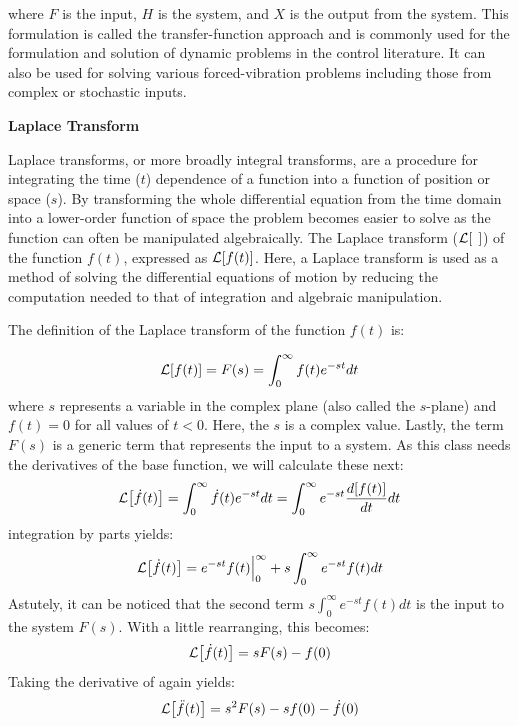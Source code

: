 \documentclass[12pt,letter]{article}
\begin{document}
			\noindent where $F$ is the input, $H$ is the system, and $X$ is the output from the system. This formulation is called the transfer-function approach and is commonly used for the formulation and solution of dynamic problems in the control literature. It can also be used for solving various forced-vibration problems including those from complex or stochastic inputs. 




\begin{review}
	\label{sec:Laplace_review}
	
	\textbf{Laplace Transform}
	
	\noindent Laplace transforms, or more broadly integral transforms, are a procedure for integrating the time ($t$) dependence of a function into a function of position or space ($s$). By transforming the whole differential equation from the time domain into a lower-order function of space the problem becomes easier to solve as the function can often be manipulated algebraically. The Laplace transform ($\mathcal{L}{\left[\hspace{1ex}\right]}$) of the function $f(t)$, expressed as $\mathcal{L}{\left[f(t)\right]}$. Here, a Laplace transform is used as a method of solving the differential equations of motion by reducing the computation needed to that of integration and algebraic manipulation. 
	
	The definition of the Laplace transform of the function $f(t)$ is:
	
	\begin{equation}
		\mathcal{L}{\left[f(t)\right]} = F(s) = \int_{0}^{\infty} f(t)e^{-st}dt
	\end{equation}
	where $s$ represents a variable in the complex plane (also called the $s$-plane) and $f(t)=0$ for all values of $t<0$. Here, the $s$ is a complex value. Lastly, the term $F(s)$ is a generic term that represents the input to a system. As this class needs the derivatives of the base function, we will calculate these next:
	\begin{equation}
		\mathcal{L}{\left[\dot{f}(t)\right]} = \int_{0}^{\infty} \dot{f}(t)e^{-st}dt = \int_{0}^{\infty} e^{-st}\frac{d[f(t)]}{dt}dt 
	\end{equation}		
	integration by parts yields:
	\begin{equation}
		\mathcal{L}{\left[\dot{f}(t)\right]} = e^{-st}f(t)\Big|_0^\infty+s\int_{0}^{\infty}e^{-st}f(t)dt
	\end{equation}
	Astutely, it can be noticed that the second term $s\int_{0}^{\infty}e^{-st}f(t)dt$
	is the input to the system $F(s)$. With a little rearranging, this becomes:
	\begin{equation}
		\mathcal{L}{\left[\dot{f}(t)\right]} = sF(s)-f(0)
	\end{equation}
	Taking the derivative of again yields:
	\begin{equation}
		\mathcal{L}{\left[\ddot{f}(t)\right]} = s^2F(s)-sf(0)-\dot{f}(0)
	\end{equation}
	

\end{review}
\end{document}

